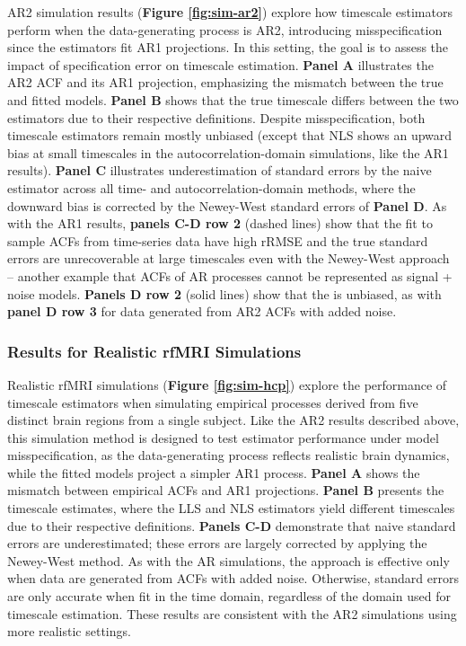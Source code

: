 \documentclass[docs/main.tex]{subfiles}
\begin{document}
AR2 simulation results (\textbf{Figure \ref{fig:sim-ar2}}) explore how timescale estimators perform when the data-generating process is AR2, introducing misspecification since the estimators fit AR1 projections. In this setting, the goal is to assess the impact of specification error on timescale estimation. \textbf{Panel A} illustrates the AR2 ACF and its AR1 projection, emphasizing the mismatch between the true and fitted models. \textbf{Panel B} shows that the true timescale differs between the two estimators due to their respective definitions. Despite misspecification, both timescale estimators remain mostly unbiased (except that NLS shows an upward bias at small timescales in the autocorrelation-domain simulations, like the AR1 results). \textbf{Panel C} illustrates underestimation of standard errors by the naive estimator across all time- and autocorrelation-domain methods, where the downward bias is corrected by the Newey-West standard errors of \textbf{Panel D}. As with the AR1 results, \textbf{panels C-D row 2} (dashed lines) show that the  fit to sample ACFs from time-series data have high rRMSE and the true standard errors are unrecoverable at large timescales even with the Newey-West approach -- another example that ACFs of AR processes cannot be represented as signal + noise models. \textbf{Panels D row 2} (solid lines) show that the  is unbiased, as with  \textbf{panel D row 3} for data generated from AR2 ACFs with added noise.


\subsubsection{Results for Realistic rfMRI Simulations}

Realistic rfMRI simulations (\textbf{Figure \ref{fig:sim-hcp}}) explore the performance of timescale estimators when simulating empirical processes derived from five distinct brain regions from a single subject. Like the AR2 results described above, this simulation method is designed to test estimator performance under model misspecification, as the data-generating process reflects realistic brain dynamics, while the fitted models project a simpler AR1 process. \textbf{Panel A} shows the mismatch between empirical ACFs and AR1 projections. \textbf{Panel B} presents the timescale estimates, where the LLS and NLS estimators yield different timescales due to their respective definitions. \textbf{Panels C-D} demonstrate that naive standard errors are underestimated; these errors are largely corrected by applying the Newey-West method. As with the AR simulations, the  approach is effective only when data are generated from ACFs with added noise. Otherwise, standard errors are only accurate when fit in the time domain, regardless of the domain used for timescale estimation. These results are consistent with the AR2 simulations using more realistic settings.
\end{document}
